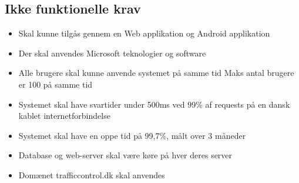 \subsection{Ikke funktionelle krav}
\begin{itemize}[-]
	\itemsep 0.3em 
	\item Skal kunne tilgås gennem en Web applikation og Android applikation
	\item Der skal anvendes Microsoft teknologier og software
	\item Alle brugere skal kunne anvende systemet på samme tid Maks antal brugere er 100 på samme tid
	\item Systemet skal have svartider under 500ms ved 99\% af requests på en dansk kablet internetforbindelse
	\item Systemet skal have en oppe tid på 99,7\%, målt over 3 måneder
	\item Database og web-server skal være køre på hver deres server
	\item Domænet trafficcontrol.dk skal anvendes 
\end{itemize}

\hspace{1em}

\newpage
